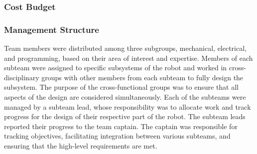 \documentclass[class=article, crop=false]{standalone}
\begin{document}
	
%	
	
	
	
	\subsubsection{Cost Budget}
	
	\subsubsection{Management Structure}
	Team members were distributed among three subgroups, mechanical, electrical, and programming, based on their area of interest and expertise. Members of each subteam were assigned to specific subsystems of the robot and worked in cross-disciplinary groups with other members from each subteam to fully design the subsystem. The purpose of the cross-functional groups was to ensure that all aspects of the design are considered simultaneously. Each of the subteams were managed by a subteam lead, whose responsibility was to allocate work and track progress for the design of their respective part of the robot. The subteam leads reported their progress to the team captain. The captain was responsible for tracking objectives, facilitating integration between various subteams, and ensuring that the high-level requirements are met.



	
	
	


	
\end{document}
